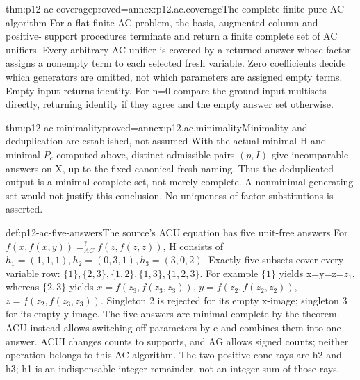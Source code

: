 \begin{hbtheorem}{thm:p12-ac-coverage}{proved=annex:p12.ac.coverage}{The complete finite pure-AC algorithm}
For a flat finite AC problem, the basis, augmented-column and positive-
support procedures terminate and return a finite complete set of AC
unifiers. Every arbitrary AC unifier is covered by a returned answer
whose factor assigns a nonempty term to each selected fresh variable.
Zero coefficients decide which generators are omitted, not which
parameters are assigned empty terms. Empty input returns identity.
For n=0 compare the ground input multisets directly, returning identity
if they agree and the empty answer set otherwise.
\end{hbtheorem}

\begin{hbtheorem}{thm:p12-ac-minimality}{proved=annex:p12.ac.minimality}{Minimality and deduplication are established, not assumed}
With the actual minimal H and minimal \(P_c\) computed above,
distinct admissible pairs \((p,I)\) give incomparable answers
on X, up to the fixed canonical fresh naming. Thus the deduplicated
output is a minimal complete set, not merely complete. A nonminimal
generating set would not justify this conclusion. No uniqueness of
factor substitutions is asserted.
\end{hbtheorem}

\begin{hbexample}{def:p12-ac-five-answers}{The source's ACU equation has five unit-free answers}
For \(f(x,f(x,y))=^{?}_{AC}f(z,f(z,z))\), H consists of
\(h_1=(1,1,1),h_2=(0,3,1),h_3=(3,0,2)\).
Exactly five subsets cover every variable row:
\(\{1\},\{2,3\},\{1,2\},\{1,3\},\{1,2,3\}\).
For example \(\{1\}\) yields x=y=z=\(z_1\), whereas
\(\{2,3\}\) yields \(x=f(z_3,f(z_3,z_3))\),
\(y=f(z_2,f(z_2,z_2))\), \(z=f(z_2,f(z_3,z_3))\).
Singleton 2 is rejected for its empty x-image; singleton 3 for its
empty y-image. The five answers are minimal complete by the theorem.
ACU instead allows switching off parameters by e and combines them
into one answer. ACUI changes counts to supports, and AG allows signed
counts; neither operation belongs to this AC algorithm.
The two positive cone rays are h2 and h3; h1 is an indispensable
integer remainder, not an integer sum of those rays.
\cite[pp.~505--506]{BaaderSnyder2001}
\end{hbexample}


